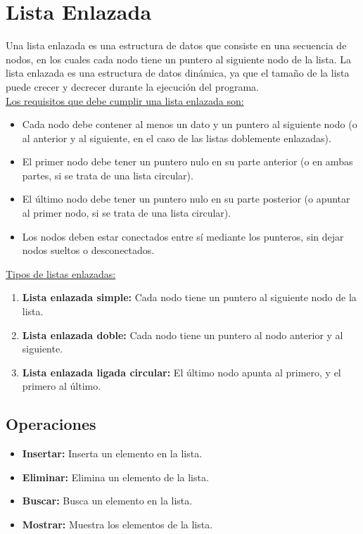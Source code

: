 \documentclass[../main.tex]{subfiles}
\begin{document}
\section{Lista Enlazada} 

    Una lista enlazada es una estructura de datos que consiste en una secuencia de nodos, en los cuales cada nodo tiene un puntero al siguiente nodo de la lista. La lista enlazada es una estructura de datos dinámica, ya que el tamaño de la lista puede crecer y decrecer durante la ejecución del programa.\\

    \underline{Los requisitos que debe cumplir una lista enlazada son:}
    \begin{itemize}
        \item Cada nodo debe contener al menos un dato y un puntero al siguiente nodo (o al anterior y al siguiente, en el caso de las listas doblemente enlazadas).

        \item El primer nodo debe tener un puntero nulo en su parte anterior (o en ambas partes, si se trata de una lista circular).
        \item El último nodo debe tener un puntero nulo en su parte posterior (o apuntar al primer nodo, si se trata de una lista circular).
        \item Los nodos deben estar conectados entre sí mediante los punteros, sin dejar nodos sueltos o desconectados.
        
    \end{itemize}

    \underline{Tipos de listas enlazadas:}
    \begin{enumerate}
        \item \textbf{Lista enlazada simple:} Cada nodo tiene un puntero al siguiente nodo de la lista.
        \item \textbf{Lista enlazada doble:} Cada nodo tiene un puntero al nodo anterior y al siguiente.
        \item  \textbf{Lista enlazada ligada circular:} El último nodo apunta al primero, y el primero al último.
    \end{enumerate}

    \subsection{Operaciones}
        \begin{itemize}
            \item \textbf{Insertar:} Inserta un elemento en la lista.
            \item \textbf{Eliminar:} Elimina un elemento de la lista.
            \item \textbf{Buscar:} Busca un elemento en la lista.
            \item \textbf{Mostrar:} Muestra los elementos de la lista.
        \end{itemize}
\end{document}
